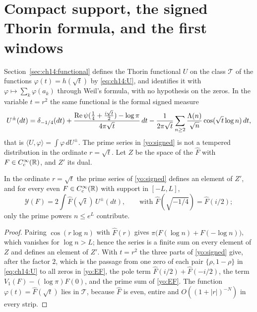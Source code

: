 \section[Compact support and the signed Thorin formula]{Compact support, the signed Thorin formula, and the first windows}\label{yo:sec:Z}

Section~\ref{sec:ch14:functional} defines the Thorin functional $U$ on the class $\mathcal T$ of the functions $\varphi(t)=h(\sqrt t)$ by \eqref{eq:ch14:U}, and identifies it with $\varphi\mapsto\sum_k\varphi(a_k)$ through Weil's formula, with no hypothesis on the zeros. In the variable $t=r^2$ the same functional is the formal signed measure
\begin{equation}\label{yo:signed}
U^\pm(dt)=\delta_{-1/4}(dt)+\frac{\operatorname{Re}\psi(\frac14+\frac{i\sqrt t}2)-\log\pi}{4\pi\sqrt t}\,dt-\frac1{2\pi\sqrt t}\sum_{n\ge2}\frac{\Lambda(n)}{\sqrt n}\cos(\sqrt t\log n)\,dt ,
\end{equation}
that is $\langle U,\varphi\rangle=\int\varphi\,dU^\pm$. The prime series in \eqref{yo:signed} is not a tempered distribution in the ordinate $r=\sqrt t$. Let $Z$ be the space of the $\widehat F$ with $F\in C_c^\infty(\mathbb{R})$, and $Z'$ its dual.

\begin{proposition}\label{yo:prop:Z}
In the ordinate $r=\sqrt t$ the prime series of \eqref{yo:signed} defines an element of $Z'$, and for every even $F\in C_c^\infty(\mathbb{R})$ with support in $[-L,L]$,
\[
\mathcal Y(F)=2\int\widehat F(\sqrt t)\,U^\pm(dt),\qquad\text{with }\widehat F(\sqrt{-1/4})=\widehat F(i/2);
\]
only the prime powers $n\le e^L$ contribute.
\end{proposition}

\begin{proof}
Pairing $\cos(r\log n)$ with $\widehat F(r)$ gives $\pi\bigl(F(\log n)+F(-\log n)\bigr)$, which vanishes for $\log n>L$; hence the series is a finite sum on every element of $Z$ and defines an element of $Z'$. With $t=r^2$ the three parts of \eqref{yo:signed} give, after the factor $2$, which is the passage from one zero of each pair $\{\rho,1-\rho\}$ in \eqref{eq:ch14:U} to all zeros in \eqref{yo:EF}, the pole term $\widehat F(i/2)+\widehat F(-i/2)$, the term $V_1(F)-(\log\pi)F(0)$, and the prime sum of \eqref{yo:EF}. The function $\varphi(t)=\widehat F(\sqrt t)$ lies in $\mathcal T$, because $\widehat F$ is even, entire and $O((1+|r|)^{-N})$ in every strip.
\end{proof}

